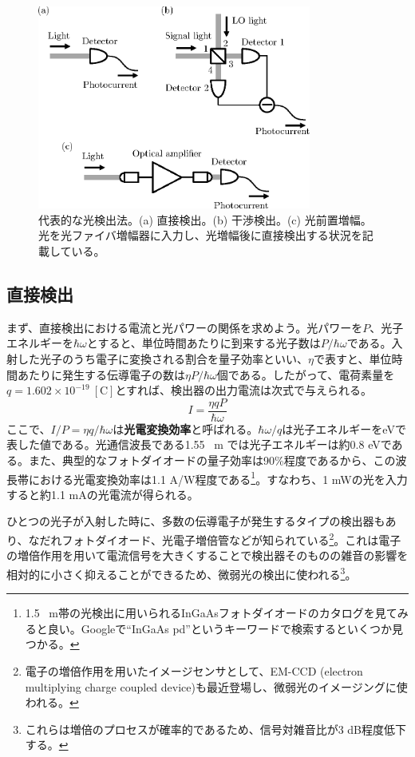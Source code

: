 \begin{figure}
  \centering
  \includegraphics[width=9cm]{fig/1-1_photodetection.eps}
  \caption{代表的な光検出法。(a) 直接検出。(b) 干渉検出。(c) 光前置増幅。光を光ファイバ増幅器に入力し、光増幅後に直接検出する状況を記載している。}
  \label{fig:photodetection}
\end{figure}

\subsection{直接検出}
まず、直接検出における電流と光パワーの関係を求めよう。光パワーを$P$、光子エネルギーを$\hbar \omega$とすると、単位時間あたりに到来する光子数は$P/\hbar \omega$である。入射した光子のうち電子に変換される割合を量子効率といい、$\eta$で表すと、単位時間あたりに発生する伝導電子の数は$\eta P/\hbar \omega$個である。したがって、電荷素量を$q = 1.602 \times 10^{-19} \ \mathrm{[C]}$とすれば、検出器の出力電流は次式で与えられる。
\begin{equation}
	I = \frac{\eta q P}{\hbar \omega}
	\nonumber
\end{equation}
ここで、$I/P = \eta q / \hbar \omega$は\textbf{光電変換効率}と呼ばれる。$\hbar \omega / q$は光子エネルギーをeVで表した値である。光通信波長である1.55 \ \textmu m では光子エネルギーは約0.8 eVである。また、典型的なフォトダイオードの量子効率は90\%程度であるから、この波長帯における光電変換効率は1.1 A/W程度である\footnote{1.5 \ \textmu m帯の光検出に用いられるInGaAsフォトダイオードのカタログを見てみると良い。Googleで``InGaAs pd''というキーワードで検索するといくつか見つかる。}。すなわち、1 mWの光を入力すると約1.1 mAの光電流が得られる。

ひとつの光子が入射した時に、多数の伝導電子が発生するタイプの検出器もあり、なだれフォトダイオード、光電子増倍管などが知られている\footnote{電子の増倍作用を用いたイメージセンサとして、EM-CCD (electron multiplying charge coupled device)も最近登場し、微弱光のイメージングに使われる。}。これは電子の増倍作用を用いて電流信号を大きくすることで検出器そのものの雑音の影響を相対的に小さく抑えることができるため、微弱光の検出に使われる\footnote{これらは増倍のプロセスが確率的であるため、信号対雑音比が3 dB程度低下する。}。


